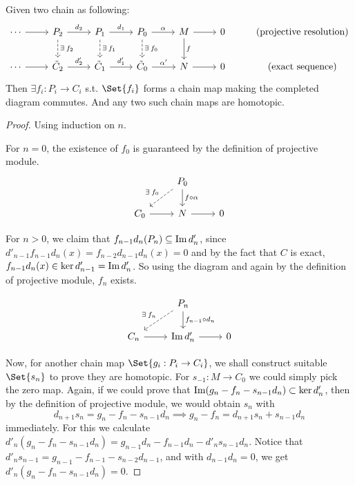 \begin{theorem} \label{thm:comparison-theorem}
  Given two chain as following:
  \[
    \begin{tikzcd}
      \dotsm \ar[r] & P_2 \ar[r, "d_2"] \ar[d, dashed, "\exists f_2"]
                    & P_1 \ar[r, "d_1"] \ar[d, dashed, "\exists f_1"]
                    & P_0 \ar[r, "\alpha"] \ar[d, dashed, "\exists f_0"]
                    & M \ar[r] \ar[d, "f"] & 0
                    & \text{(projective resolution)} \\
      \dotsm \ar[r] & \tilde C_2 \ar[r, "d_2'"]
                    & \tilde C_1 \ar[r, "d_1'"]
                    & \tilde C_0 \ar[r, "\alpha'"]
                    & N \ar[r] & 0
                    & \text{(exact sequence)}
    \end{tikzcd}
  \]
  Then $\exists f_i : P_i \to C_i$ s.t. $\Set{f_i}$ forms a chain map making the
  completed diagram commutes. And any two such chain maps are homotopic.
  \begin{proof}
    Using induction on $n$.

    For $n = 0$, the existence of $f_0$ is guaranteed by the definition of projective module.
    \[ \begin{tikzcd}
        & P_0 \ar[d, "f \circ \alpha"] \ar[ld, dashed, "\exists f_0"'] & \\
        C_0 \ar[r] & N \ar[r] & 0
    \end{tikzcd} \]

    For $n > 0$, we claim that $f_{n-1} d_n (P_n) \subseteq \operatorname{Im} d'_{n}$,
    since $d'_{n-1} f_{n-1} d_n (x) = f_{n-2} d_{n-1} d_n (x) = 0$ and
    by the fact that $C$ is exact, $f_{n-1} d_n (x) \in \ker d'_{n-1} = \operatorname{Im} d'_n$.
    So using the diagram and again by the definition of projective module,
    $f_n$ exists.

    \[ \begin{tikzcd}
        & P_n \ar[d, "f_{n-1} \circ d_n"] \ar[ld, dashed, "\exists f_n"'] & \\
        C_n \ar[r] & \Image d'_n \ar[r] & 0
    \end{tikzcd} \]

    Now, for another chain map $\Set{g_i: P_i \to C_i}$, we shall construct suitable $\Set{s_n}$
    to prove they are homotopic. For $s_{-1} : M \to C_0$ we could simply pick the
    zero map. Again, if we could prove that
    $\operatorname{Im} (g_n - f_n - s_{n-1} d_n) \subset \ker d'_n$, then by
    the definition of projective module, we would obtain $s_n$ with
    \[ d_{n+1} s_n = g_n - f_n - s_{n-1} d_n \implies g_n - f_n = d_{n+1} s_n + s_{n-1} d_n \]
    immediately. For this we calculate $d'_n (g_n - f_n - s_{n-1} d_n)
    = g_{n-1} d_n - f_{n-1} d_n - d'_n s_{n-1} d_n$. Notice that
    $d'_n s_{n-1} = g_{n-1} - f_{n-1} - s_{n-2} d_{n-1}$, and
    with $d_{n-1} d_n = 0$, we get $d'_n (g_n - f_n - s_{n-1} d_n) = 0$.
  \end{proof}
\end{theorem}

